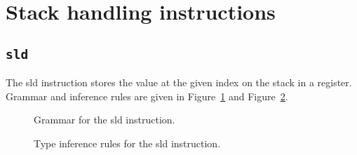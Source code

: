 \section{Stack handling instructions}\label{sec:nstar-instructionset-stack}

\subsection{\texttt{sld}}\label{subsec:nstar-instructionset-stack-sld}

The {\Iformat sld} instruction stores the value at the given index on the stack in a register.
Grammar and inference rules are given in Figure~\ref{fig:nstar-instructionset-stack-sld-grammar} and Figure~\ref{fig:nstar-instructionset-stack-sld-typerules}.

\begin{figure}[H]
	\centering


	\caption{Grammar for the {\Iformat sld} instruction.}
	\label{fig:nstar-instructionset-stack-sld-grammar}
\end{figure}

\begin{figure}[H]
	\centering


	\caption{Type inference rules for the {\Iformat sld} instruction.}
	\label{fig:nstar-instructionset-stack-sld-typerules}
\end{figure}


